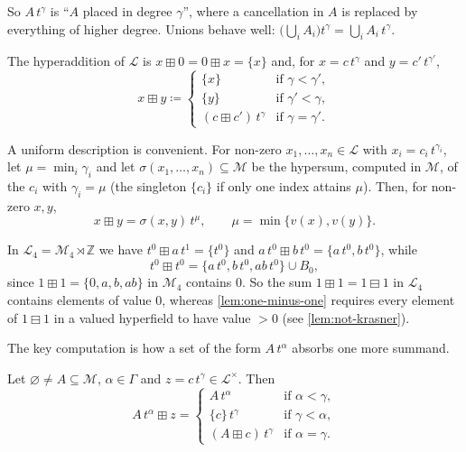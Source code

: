 \documentclass[11pt]{amsart}
\numberwithin{equation}{section}
\newcommand{\hplus}{\boxplus}
\newcommand{\hminus}{\boxminus}
\newcommand{\Mas}{\mathcal M}
\newcommand{\Lay}{\mathcal L}
\newcommand{\Z}{\mathbb Z}
\newcommand{\lt}[2]{#1\,t^{#2}}
\begin{document}
So $\lt{A}{\gamma}$ is ``$A$ placed in degree $\gamma$'', where a cancellation in $A$ is replaced by everything of higher degree. Unions behave well: $\bigl(\bigcup_iA_i\bigr)t^\gamma=\bigcup_i\lt{A_i}{\gamma}$.

\begin{definition}\label{def:layer}
The hyperaddition of $\Lay$ is $x\hplus0=0\hplus x=\{x\}$ and, for $x=c\,t^\gamma$ and $y=c'\,t^{\gamma'}$,
\[
  x\hplus y\coloneqq\begin{cases}
  \{x\} & \text{if }\gamma<\gamma',\\
  \{y\} & \text{if }\gamma'<\gamma,\\
  \lt{(c\hplus c')}{\gamma} & \text{if }\gamma=\gamma'.
  \end{cases}
\]
\end{definition}

A uniform description is convenient. For non-zero $x_1,\dots,x_n\in\Lay$ with $x_i=c_i\,t^{\gamma_i}$, let $\mu=\min_i\gamma_i$ and let $\sigma(x_1,\dots,x_n)\subseteq\Mas$ be the hypersum, computed in $\Mas$, of the $c_i$ with $\gamma_i=\mu$ (the singleton $\{c_i\}$ if only one index attains $\mu$). Then, for non-zero $x,y$,
\begin{equation}\label{eq:two-sum}
  x\hplus y=\lt{\sigma(x,y)}{\mu},\qquad \mu=\min\{v(x),v(y)\}.
\end{equation}

\begin{example}\label{ex:L4}
In $\Lay_4=\Mas_4\rtimes\Z$ we have $t^0\hplus a\,t^1=\{t^0\}$ and $a\,t^0\hplus b\,t^0=\{a\,t^0,b\,t^0\}$, while
\[
  t^0\hplus t^0=\{a\,t^0, b\,t^0, ab\,t^0\}\cup B_0,
\]
since $1\hplus1=\{0,a,b,ab\}$ in $\Mas_4$ contains $0$. So the sum $1\hplus1=1\hminus1$ in $\Lay_4$ contains elements of value $0$, whereas \cref{lem:one-minus-one} requires every element of $1\hminus1$ in a valued hyperfield to have value $>0$ (see \cref{lem:not-krasner}).
\end{example}

The key computation is how a set of the form $\lt{A}{\alpha}$ absorbs one more summand.

\begin{lemma}\label{lem:union}
Let $\varnothing\ne A\subseteq\Mas$, $\alpha\in\Gamma$ and $z=c\,t^\gamma\in\Lay^\times$. Then
\[
  \lt{A}{\alpha}\hplus z=\begin{cases}
  \lt{A}{\alpha} & \text{if }\alpha<\gamma,\\
  \lt{\{c\}}{\gamma} & \text{if }\gamma<\alpha,\\
  \lt{(A\hplus c)}{\gamma} & \text{if }\alpha=\gamma.
  \end{cases}
\]
\end{lemma}
\end{document}
